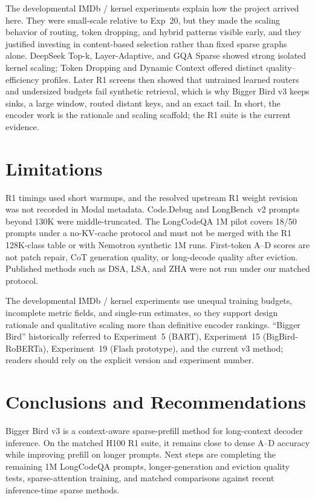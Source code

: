 \documentclass[11pt]{article}
\begin{document}
The developmental IMDb / kernel experiments explain how the project arrived
here. They were small-scale relative to Exp~20, but they made the scaling
behavior of routing, token dropping, and hybrid patterns visible early, and
they justified investing in content-based selection rather than fixed sparse
graphs alone. DeepSeek Top-k, Layer-Adaptive, and GQA Sparse showed strong
isolated kernel scaling; Token Dropping and Dynamic Context offered distinct
quality--efficiency profiles. Later R1 screens then showed that untrained
learned routers and undersized budgets fail synthetic retrieval, which is why
Bigger Bird v3 keeps sinks, a large window, routed distant keys, and an exact
tail. In short, the encoder work is the rationale and scaling scaffold; the
R1 suite is the current evidence.

\section{Limitations}
\label{sec:limitations}

R1 timings used short warmups, and the resolved upstream R1 weight revision
was not recorded in Modal metadata. Code.Debug and LongBench~v2 prompts beyond
130K were middle-truncated. The LongCodeQA 1M pilot covers 18/50 prompts under a
no-KV-cache protocol and must not be merged with the R1 128K-class table or
with Nemotron synthetic 1M runs. First-token A--D scores are not patch repair,
CoT generation quality, or long-decode quality after eviction. Published
methods such as DSA, LSA, and ZHA were not run under our matched protocol.

The developmental IMDb / kernel experiments use unequal training budgets,
incomplete metric fields, and single-run estimates, so they support design
rationale and qualitative scaling more than definitive encoder rankings.
``Bigger Bird'' historically referred to Experiment~5 (BART), Experiment~15
(BigBird-RoBERTa), Experiment~19 (Flash prototype), and the current v3 method;
readers should rely on the explicit version and experiment number.

\section{Conclusions and Recommendations}

Bigger Bird v3 is a context-aware sparse-prefill method for long-context
decoder inference. On the matched H100 R1 suite, it remains close to dense
A--D accuracy while improving prefill on longer prompts. Next steps are
completing the remaining 1M LongCodeQA prompts, longer-generation and
eviction quality tests, sparse-attention training, and matched comparisons
against recent inference-time sparse methods.


\clearpage
{}



\clearpage
\appendix

\end{document}
